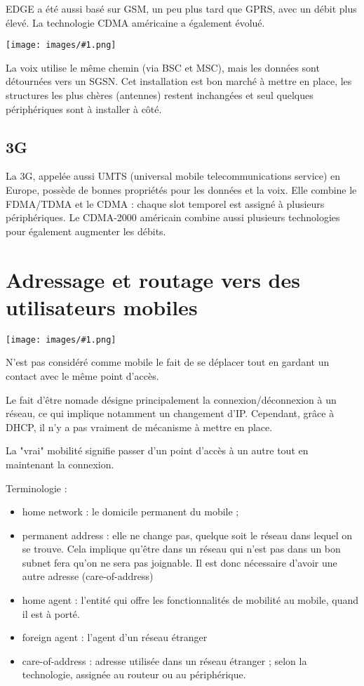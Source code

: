 \documentclass[10pt,a4paper]{report}
\newcommand{\dessin}[1]{\begin{center}\texttt{[image: images/\#1.png]}\end{center}}
\newcommand{\dessinS}[2]{\begin{center}\texttt{[image: images/\#1.png]}\end{center}}
\begin{document}
	EDGE a été aussi basé sur GSM, un peu plus tard que GPRS, avec un débit plus élevé. La technologie CDMA américaine a également évolué.
	
	\dessin{48}
	
	
	La voix utilise le même chemin (via BSC et MSC), mais les données sont détournées vers un SGSN. Cet installation est bon marché à mettre en place, les structures les plus chères (antennes) restent inchangées et seul quelques périphériques sont à installer à côté.
  
	\subsection{3G}
	
	La 3G, appelée aussi UMTS (universal mobile telecommunications service) en Europe, possède de bonnes propriétés pour les données et la voix. Elle combine le FDMA/TDMA et le CDMA : chaque slot temporel est assigné à plusieurs périphériques. Le CDMA-2000 américain combine aussi plusieurs technologies pour également augmenter les débits.
      
  
	\section{Adressage et routage vers des utilisateurs mobiles}
  
	\dessinS{49}{.65}
  
	N'est pas considéré comme mobile le fait de se déplacer tout en gardant un contact avec le même point d'accès.
  
	Le fait d'être nomade désigne principalement la connexion/déconnexion à un réseau, ce qui implique notamment un changement d'IP. Cependant, grâce à DHCP, il n'y a pas vraiment de mécanisme à mettre en place.
  
	La "vrai" mobilité signifie passer d'un point d'accès à un autre tout en maintenant la connexion.
  
	Terminologie :
  
	\begin{itemize}
		\item home network : le domicile permanent du mobile ;
		\item permanent address : elle ne change pas, quelque soit le réseau dans lequel on se trouve. Cela implique qu'être dans un réseau qui n'est pas dans un bon subnet fera qu'on ne sera pas joignable. Il est donc nécessaire d'avoir une autre adresse (care-of-address)
		\item home agent : l'entité qui offre les fonctionnalités de mobilité au mobile, quand il est à porté.
		\item foreign agent : l'agent d'un réseau étranger
		\item care-of-address : adresse utilisée dans un réseau étranger ; selon la technologie, assignée au routeur ou au périphérique.
	\end{itemize}
  
\end{document}

